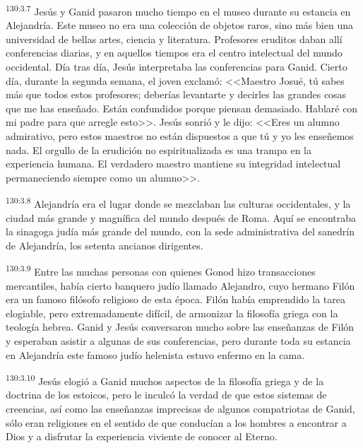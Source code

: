\par 
\textsuperscript{130:3.7} Jesús y Ganid pasaron mucho tiempo en el museo durante su estancia en Alejandría. Este museo no era una colección de objetos raros, sino más bien una universidad de bellas artes, ciencia y literatura. Profesores eruditos daban allí conferencias diarias, y en aquellos tiempos era el centro intelectual del mundo occidental. Día tras día, Jesús interpretaba las conferencias para Ganid. Cierto día, durante la segunda semana, el joven exclamó: <<Maestro Josué, tú sabes más que todos estos profesores; deberías levantarte y decirles las grandes cosas que me has enseñado. Están confundidos porque piensan demasiado. Hablaré con mi padre para que arregle esto>>. Jesús sonrió y le dijo: <<Eres un alumno admirativo, pero estos maestros no están dispuestos a que tú y yo les enseñemos nada. El orgullo de la erudición no espiritualizada es una trampa en la experiencia humana. El verdadero maestro mantiene su integridad intelectual permaneciendo siempre como un alumno>>.

\par 
\textsuperscript{130:3.8} Alejandría era el lugar donde se mezclaban las culturas occidentales, y la ciudad más grande y magnífica del mundo después de Roma. Aquí se encontraba la sinagoga judía más grande del mundo, con la sede administrativa del sanedrín de Alejandría, los setenta ancianos dirigentes.

\par 
\textsuperscript{130:3.9} Entre las muchas personas con quienes Gonod hizo transacciones mercantiles, había cierto banquero judío llamado Alejandro, cuyo hermano Filón era un famoso filósofo religioso de esta época. Filón había emprendido la tarea elogiable, pero extremadamente difícil, de armonizar la filosofía griega con la teología hebrea. Ganid y Jesús conversaron mucho sobre las enseñanzas de Filón y esperaban asistir a algunas de sus conferencias, pero durante toda su estancia en Alejandría este famoso judío helenista estuvo enfermo en la cama.

\par 
\textsuperscript{130:3.10} Jesús elogió a Ganid muchos aspectos de la filosofía griega y de la doctrina de los estoicos, pero le inculcó la verdad de que estos sistemas de creencias, así como las enseñanzas imprecisas de algunos compatriotas de Ganid, sólo eran religiones en el sentido de que conducían a los hombres a encontrar a Dios y a disfrutar la experiencia viviente de conocer al Eterno.

